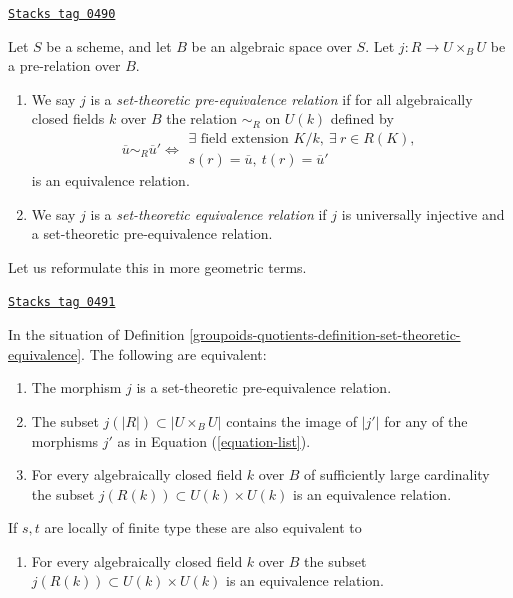 \begin{definition}
\label{groupoids-quotients-definition-set-theoretic-equivalence}
\href{https://stacks.math.columbia.edu/tag/0490}{\texttt{Stacks tag 0490}}

Let $S$ be a scheme, and let $B$ be an algebraic space over $S$.
Let $j : R \to U \times_B U$ be a pre-relation over $B$.
\begin{enumerate}
\item We say $j$ is a {\it set-theoretic pre-equivalence relation} if
for all algebraically closed fields $k$ over $B$ the relation
$\sim_R$ on $U(k)$ defined by
$$
\overline{u} \sim_R \overline{u}'
\Leftrightarrow
\begin{matrix}
\exists\text{ field extension }K/k, \ \exists\ r \in R(K), \\
s(r) = \overline{u}, \ t(r) = \overline{u}'
\end{matrix}
$$
is an equivalence relation.
\item We say $j$ is a {\it set-theoretic equivalence relation}
if $j$ is universally injective and a set-theoretic pre-equivalence
relation.
\end{enumerate}
\end{definition}

Let us reformulate this in more geometric terms.

\begin{lemma}
\label{groupoids-quotients-lemma-set-theoretic-pre-equivalence-geometric}
\href{https://stacks.math.columbia.edu/tag/0491}{\texttt{Stacks tag 0491}}

In the situation of Definition \ref{groupoids-quotients-definition-set-theoretic-equivalence}.
The following are equivalent:
\begin{enumerate}
\item The morphism $j$ is a set-theoretic pre-equivalence relation.
\item The subset $j(|R|) \subset |U \times_B U|$ contains the image of
$|j'|$ for any of the morphisms $j'$ as in Equation (\ref{equation-list}).
\item For every algebraically closed field $k$ over $B$ of sufficiently large
cardinality the subset $j(R(k)) \subset U(k) \times U(k)$ is an equivalence
relation.
\end{enumerate}
If $s, t$ are locally of finite type these are also equivalent to
\begin{enumerate}
\item[(4)] For every algebraically closed field $k$ over $B$
the subset $j(R(k)) \subset U(k) \times U(k)$ is an equivalence relation.
\end{enumerate}
\end{lemma}

